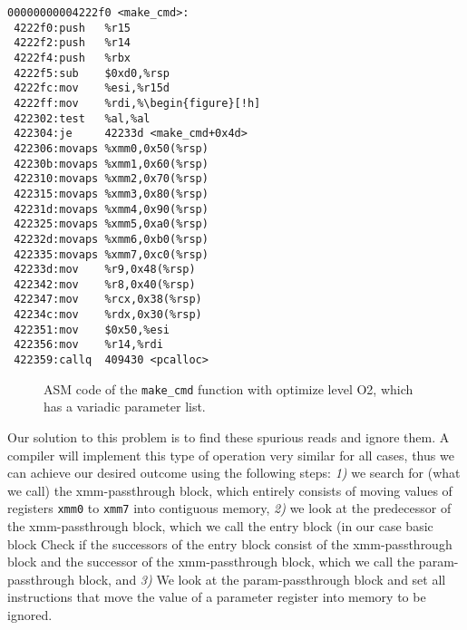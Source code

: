 \newsavebox{\firstlistingA}
\begin{lrbox}{\firstlistingA}
\begin{minipage}[c]{0.45\linewidth}
\begin{verbatim}
00000000004222f0 <make_cmd>:
 4222f0:push   %r15
 4222f2:push   %r14
 4222f4:push   %rbx
 4222f5:sub    $0xd0,%rsp
 4222fc:mov    %esi,%r15d
 4222ff:mov    %rdi,%\begin{figure}[!h]
 422302:test   %al,%al
 422304:je     42233d <make_cmd+0x4d>
 422306:movaps %xmm0,0x50(%rsp)
 42230b:movaps %xmm1,0x60(%rsp)
 422310:movaps %xmm2,0x70(%rsp)
 422315:movaps %xmm3,0x80(%rsp)
 42231d:movaps %xmm4,0x90(%rsp)
 422325:movaps %xmm5,0xa0(%rsp)
 42232d:movaps %xmm6,0xb0(%rsp)
 422335:movaps %xmm7,0xc0(%rsp)
 42233d:mov    %r9,0x48(%rsp)
 422342:mov    %r8,0x40(%rsp)
 422347:mov    %rcx,0x38(%rsp)
 42234c:mov    %rdx,0x30(%rsp)
 422351:mov    $0x50,%esi
 422356:mov    %r14,%rdi
 422359:callq  409430 <pcalloc>
\end{verbatim}
\end{minipage}
\end{lrbox}
\begin{figure}[H]
\centering
{\usebox{\firstlistingA}} 
\caption{ASM code of the \texttt{make\_cmd} function with optimize level O2, which has a variadic parameter list.}
\label{fig:asmvariadic}
\end{figure}

Our solution to this problem is to find these spurious reads and ignore them. A compiler will implement this type of operation very 
similar for all cases, thus we can achieve our desired outcome using the following steps:
\textit{1)} we search for (what we call) the xmm-passthrough block, which entirely consists of moving values of registers \texttt{xmm0} to \texttt{xmm7} into contiguous memory, %
\textit{2)} we look at the predecessor of the xmm-passthrough block, which we call the entry block (in our case basic block %
Check if the successors of the entry block consist of the xmm-passthrough block and the successor of the 
xmm-passthrough block, which we call the param-passthrough block, and
\textit{3)} We look at the param-passthrough block and set all instructions that move the value of a parameter register into memory to be ignored. %

